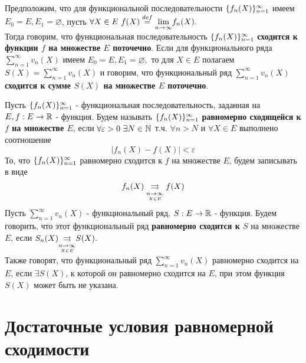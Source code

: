 \documentclass[main]{subfiles}
\begin{document}
   \begin{definition}
Предположим, что для функциональной последовательности $\fnn[f_n(X)]$ имеем $E_0=E, E_1=\varnothing$, 
пусть $\forall X\in E\ f(X)\stackrel{def}{=}\Lim f_n(X).$\\ 
Тогда говорим, что функциональная последовательность 
$\fnn[f_n(X)]$ \textbf{сходится к функции $f$ на множестве $E$ поточечно}.
 Если для функционального ряда $\sum^{\infty}_{n=1} v_n(X)$ имеем $E_0=E, E_1=\varnothing,$ 
 то для $X\in E$ полагаем $S(X)=\sum^{\infty}_{n=1} v_n(X)$ и говорим, что функциональный ряд
  $\sum^{\infty}_{n=1} v_n(X)$ \textbf{сходится к сумме $S(X)$ на множестве $E$ поточечно}. \end{definition}
\begin{definition}
Пусть $\fnn[f_n(X)]$ - функциональная последовательность, заданная на $E, f:E\to{\vR}$ - функция. 
Будем называть $\fnn[f_n(X)]$ \textbf{равномерно сходящейся к $f$ на множестве $E$}, 
если $\forall \varepsilon>0 \ \exists N\in\N $ т.ч. $\forall n>N$ и $\forall X\in E$ 
выполнено соотношение \[ |f_n(X)-f(X)|<\varepsilon\tag{1} \]
То, что $\fnn[f_n(X)]$ равномерно сходится к $f$ на множестве $E$, будем записывать в виде 
\[ f_n(X) \darrow{\underset{X\in E}{n\to\infty}}  f(X)  \]
Пусть $\sum^{\infty}_{n=1} v_n(X)$ - функциональный ряд, $S:E\to{\vR}$ - функция. Будем говорить, 
что этот функциональный ряд \textbf{равномерно сходится к $S$} на множестве $E$,
 если $S_n(X){\darrow{\underset{X\in E}{n\to\infty}}} S(X).$\\
Также говорят, что функциональный ряд $\sum^{\infty}_{n=1} v_n(X)$ равномерно сходится на $E$,
 если $\exists S(X)$, к которой он равномерно сходится на $E$, при этом функция $S(X)$ может быть не указана.
\end{definition}
\section{Достаточные условия равномерной сходимости}
\end{document}
